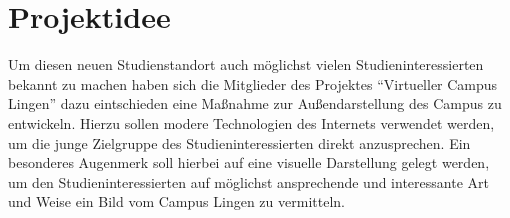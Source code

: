 \section{Projektidee}
\label{sec:Projektidee}

Um diesen neuen Studienstandort auch möglichst vielen Studieninteressierten
bekannt zu machen haben sich die Mitglieder des Projektes "`Virtueller Campus
Lingen"' dazu eintschieden eine Maßnahme zur Außendarstellung des Campus zu
entwickeln. Hierzu sollen modere Technologien des Internets verwendet werden, um
die junge Zielgruppe des Studieninteressierten direkt anzusprechen. Ein
besonderes Augenmerk soll hierbei auf eine visuelle Darstellung gelegt werden,
um den Studieninteressierten auf möglichst ansprechende und interessante Art und
Weise ein Bild vom Campus Lingen zu vermitteln.

